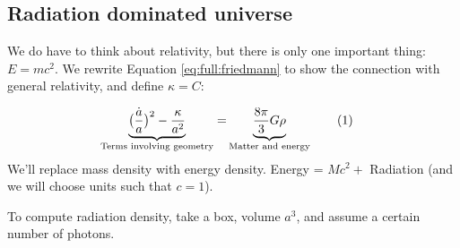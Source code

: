 \documentclass[]{article}
\newcommand\numberthis{\addtocounter{equation}{1}\tag{\theequation}}
\begin{document}
\subsection{Radiation dominated universe}\label{sec:radiation:dominated}

We do have to think about relativity, but there is only one important thing: $E=mc^2$. We rewrite Equation \eqref{eq:full:friedmann} to show the connection with general relativity, and define $\kappa = C$:

\begin{align*}
	\underbrace{\big(\frac{\dot{a}}{a}\big)^2  - \frac{\kappa}{a^2}}_\text{Terms involving geometry}=& \underbrace{\frac{8\pi}{3} G \rho}_\text{Matter and energy} \numberthis \label{eq:geometry:energy}
\end{align*}
We'll replace mass density with energy density. Energy = $Mc^2 + $ Radiation (and we will choose units such that $c=1$).

To compute radiation density, take a box, volume $a^3$, and assume a certain number of photons.
\end{document}
